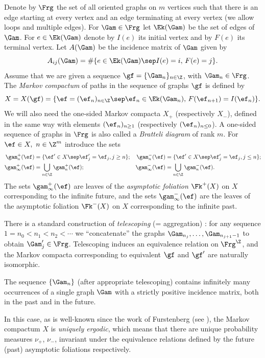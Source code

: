 Denote by $\Frg$ the set of all oriented graphs on $m$ vertices such that there is an edge starting at every vertex and an edge terminating at every vertex (we allow loops and multiple edges).
For $\Gam\in \Frg$ let $\Ek(\Gam)$ be the set of edges of $\Gam$. For $e\in \Ek(\Gam)$ denote by $I(e)$ its initial vertex and by $F(e)$ its terminal vertex. Let $A(\Gam)$ be the incidence matrix of $\Gam$ given by
\[
A_{ij}(\Gam) = \#\{e\in \Ek(\Gam)\sep I(e) = i,\,F(e) = j\}.
\]
Assume that we are given a sequence $\gf = \{\Gam_n\}_{n\in \Z}$, with $\Gam_n \in \Frg$. The \emph{Markov compactum} of paths in the sequence of graphs $\gf$ is defined by
\[
X = X(\gf) = \{\ef = (\ef_n)_{n\in \Z}\sep \ef_n \in \Ek(\Gam_n),\, F(\ef_{n+1}) = I(\ef_n)\}.
\]
We will also need the one-sided Markov compacta $X_+$ (respectively $X_-$), defined in the same way with elements $(\ef_n)_{n\ge 1}$ (respectively $(\ef_n)_{n\le 0}$). A one-sided sequence of graphs in $\Frg$ is also called a \emph{Bratteli diagram} of rank $m$.
For $\ef\in X,\ n\in \Z^m$ introduce the sets
\begin{align*}
\gam_n^+(\ef) &= \{\ef'\in X\sep \ef_j'=\ef_j, j\ge n\};& \gam_n^-(\ef) &= \{\ef'\in X\sep \ef_j'=\ef_j, j\le n\};\\
\gam_\infty^+(\ef) &= \bigcup_{n\in \Z} \gam_n^+(\ef);& \gam_\infty^-(\ef) &= \bigcup_{n\in \Z} \gam_n^-(\ef).
\end{align*}
The sets $\gam_\infty^+(\ef)$ are leaves of the \emph{asymptotic foliation} $\Fk^+(X)$ on $X$ corresponding to the infinite future, and the sets $\gam_\infty^-(\ef)$
are the leaves of the asymptotic foliation $\Fk^-(X)$ on $X$ corresponding to the infinite past.

There is a standard construction of \emph{telescoping} (= aggregation) \cite[2.4]{Buf-umn}: for any sequence $1=n_0<n_1 < n_2< \cdots$ we ``concatenate'' the graphs
$\Gam_{n_j},\ldots, \Gam_{n_{j+1}-1}$ to obtain $\Gam'_j\in \Frg$. Telescoping induces an equivalence relation on $\Frg^\Z$, and the Markov compacta corresponding to equivalent $\gf$ and $\gf'$ are naturally isomorphic.

\begin{standass}
The sequence $\{\Gam_n\}$ (after appropriate
telescoping) contains infinitely many occurrences of a single graph $\Gam$ with a strictly positive incidence matrix, both in the past and in the future.
\end{standass}

In this case, as is
well-known since the work of Furstenberg (see \eg \cite[(16.13)]{furst}), the
Markov compactum $X$ is \emph{uniquely ergodic}, which means that there are unique probability measures $\nu_+$, $\nu_-$, invariant under the equivalence relations defined by the future (past) asymptotic foliations respectively.

